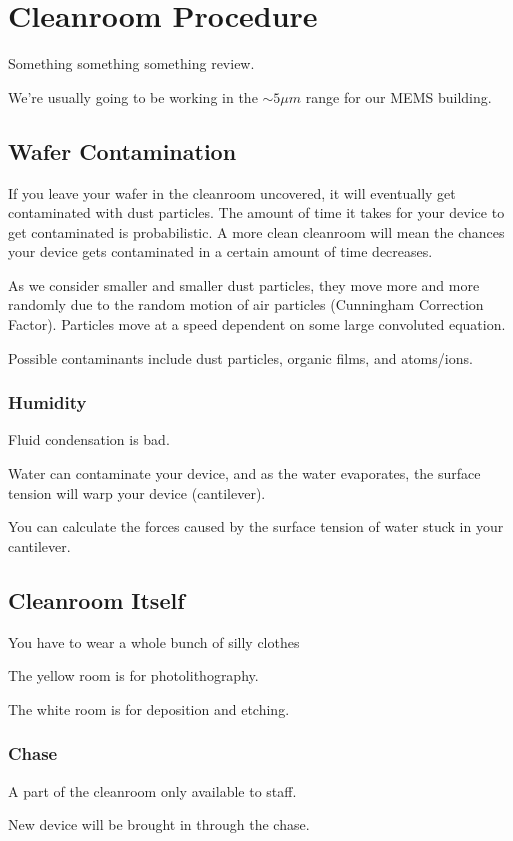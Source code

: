 \documentclass[fleqn]{report}
\begin{document}
\chapter{Cleanroom Procedure}
Something something something review.

We're usually going to be working in the $\sim 5 \mu m$ range for our 
MEMS building. 

\section{Wafer Contamination}
If you leave your wafer in the cleanroom uncovered, it will eventually 
get contaminated with dust particles. The amount of time it takes for 
your device to get contaminated is probabilistic. A more clean cleanroom
will mean the chances your device gets contaminated in a certain amount of 
time decreases.

As we consider smaller and smaller dust particles, they move more and 
more randomly due to the random motion of air particles (Cunningham 
Correction Factor). Particles move at a speed dependent on some large 
convoluted equation. 

Possible contaminants include dust particles, organic films, and atoms/ions. 

\subsection{Humidity}
Fluid condensation is bad. 

Water can contaminate your device, and as the water evaporates, the surface 
tension will warp your device (cantilever). 

You can calculate the forces caused by the surface tension of water stuck 
in your cantilever.

\section{Cleanroom Itself}
You have to wear a whole bunch of silly clothes 

The yellow room is for photolithography. 

The white room is for deposition and etching. 

\subsection{Chase}
A part of the cleanroom only available to staff. 

New device will be brought in through the chase.
\end{document}
